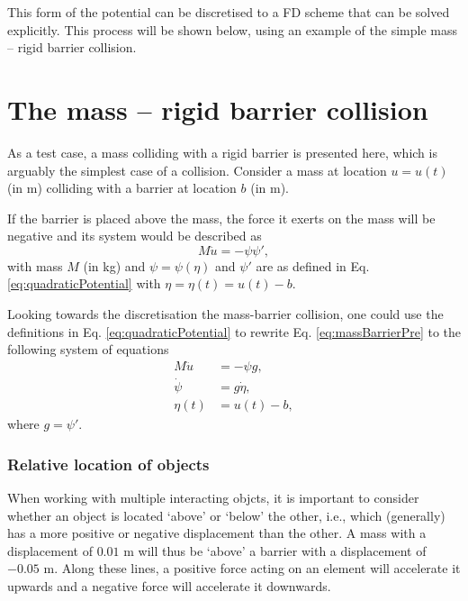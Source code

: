 This form of the potential can be discretised to a FD scheme that can be solved explicitly. This process will be shown below, using an example of the simple mass -- rigid barrier collision. 

\section{The mass -- rigid barrier collision}\label{sec:massRigidBarrier}
As a test case, a mass colliding with a rigid barrier is presented here, which is arguably the simplest case of a collision. Consider a mass at location $u = u(t)$ (in m) colliding with a barrier at location $b$ (in m).

If the barrier is placed above the mass, the force it exerts on the mass will be negative and its system would be described as
\begin{equation}\label{eq:massBarrierPre}
    M\ddot u = -\psi\psi',
\end{equation}
with mass $M$ (in kg) and $\psi = \psi(\eta)$ and $\psi'$ are as defined in Eq. \eqref{eq:quadraticPotential} with $\eta = \eta(t) = u(t) - b$. 

Looking towards the discretisation the mass-barrier collision, one could use the definitions in Eq. \eqref{eq:quadraticPotential} to rewrite Eq. \eqref{eq:massBarrierPre} to the following system of equations
\begin{subequations}\label{eq:massBarrier}
    \begin{align}
        M\ddot u &= -\psi g,\label{eq:massBarrierPDE1}\\
        \dot\psi &= g \dot\eta,\label{eq:massBarrierPDE2}\\
        \eta(t) &= u(t) - b,\label{eq:massBarrierPDE3}
    \end{align}
\end{subequations} 
where $g = \psi'$.

\subsubsection{Relative location of objects}
When working with multiple interacting objcts, it is important to consider whether an object is located `above' or `below' the other, 
%
i.e., which (generally) has a more positive or negative displacement than the other. A mass with a displacement of $0.01$ m will thus be `above' a barrier with a displacement of $-0.05$ m. Along these lines, a positive force acting on an element will accelerate it upwards and a negative force will accelerate it downwards.

